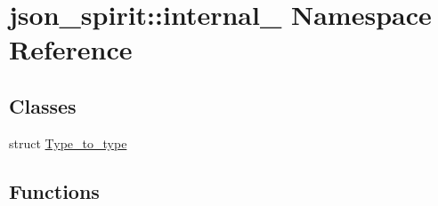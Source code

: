 \hypertarget{namespacejson__spirit_1_1internal__}{}\section{json\+\_\+spirit\+:\+:internal\+\_\+ Namespace Reference}
\label{namespacejson__spirit_1_1internal__}
\subsection*{Classes}
\begin{DoxyCompactItemize}
\item 
struct \hyperlink{structjson__spirit_1_1internal___1_1_type__to__type}{Type\+\_\+to\+\_\+type}
\end{DoxyCompactItemize}
\subsection*{Functions}
